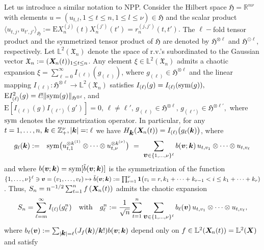 \documentclass[10pt]{article}
\def\L{\mathbb{L}}
\def\R{\mathbb{R}}
\def\Z{\mathbb{Z}}
\def\E{\mathrm E}
\def\1{{\bf 1}}
\newcommand{\mbf}[1]{\mbox{\boldmath $#1$}}
\newcommand{\HH}{\mathfrak{H}}
\begin{document}
Let us introduce a similar notation to NPP. Consider the Hilbert space $\HH = \R^{n\nu} $ with elements
$u = (u_{t,l}, 1\le t  \le n, 1\le l \le \nu ) \in \HH $ and the scalar product
$\langle u_{t,j}, u_{t', j'} \rangle_{\HH} := \E X^{(j)}_n (t) X^{(j')}_n (t') =  r_n^{(j,j')}(t,t').  $ The $\ell-$fold tensor product and the symmetrized
tensor product of $\HH$ are denoted by
$\HH^{\otimes  \ell} $ and $\HH^{\odot  \ell}, $ respectively.
Let $\L^2({\mathfrak X}_n)$ denote the space of r.v.'s subordinated to the
Gaussian vector  ${\mathfrak X}_n := ({\mbf X}_{\! n}(t))_{1\le t \le n} $. Any element $\xi \in \L^2({\mathfrak X}_n) $ admits a
chaotic expansion $\xi = \sum_{\ell = 0}^\infty I_{(\ell)} (g_{(\ell)})$, where $g_{(\ell)} \in \HH^{\otimes  \ell}$ and
the linear mapping $I_{(\ell)}: \HH^{\otimes  \ell} \to \L^2({\mathfrak X}_n)$ satisfies
$I_{(\ell)}(g) = I_{(\ell)} ({\rm sym}(g)),$ $\E I^2_{(\ell)}(g) = \ell ! \|{\rm sym}(g)\|_{\HH^{\otimes  \ell}}$, and
$\E [I_{(\ell)}(g)I_{(\ell')}(g')] = 0, \, \ell \ne \ell',  \, g_{(\ell)} \in \HH^{\otimes  \ell}, \, g_{(\ell')} \in \HH^{\otimes  \ell'},$
where ${\rm sym}$ denotes the symmetrization operator.
In particular,  for any $t=1, \dots, n,\,  {\mbf k} \in \Z^\nu_+, |{\mbf k}| =: \ell $ we have $H_{\mbf k}({\mbf X}_{\! n}(t))
= I_{(\ell)} \big(g_{\ell}({\mbf k})\big) $, where
\begin{eqnarray*}\label{hermite1}
g_\ell({\mbf k})&:=&{\rm sym} \big(u^{\otimes k^{(1)}}_{t, 1}   \otimes \cdots \otimes
u_{t, \nu}^{\otimes k^{(\nu)}}\big) \
= \ \sum_{{\mbf v}\in \{1, \ldots, \nu\}^\ell } b({\mbf v}; {\mbf k}) \,u_{t,v_1} \otimes \cdots
\otimes u_{t,v_\ell}
\end{eqnarray*}
and where $b({\mbf v}; {\mbf k}) = {\rm sym} [\tilde  b({\mbf v}; {\mbf k})] $
is the symmetrization of the function
$\{1, \dots, \nu\}^\ell \ni {\mbf v} = (v_1, \dots, v_\ell) \mapsto \tilde b({\mbf v}; {\mbf k}) :=  \prod_{r=1}^\nu
\1 \big(v_i = r, k_1 + \dots + k_{r-1} < i \le k_1 + \dots + k_r) $.
Thus, $S_n=n^{-1/2} \sum_{t=1}^n f\left({\mbf X}_{\! n}(t)\right) $ admits the chaotic expansion
$$
S_n=\sum_{\ell =m}^\infty I_{(\ell)}(g_\ell^n)\quad \mbox{with}\quad g_\ell^n := \frac{1}{\sqrt{n}}
\sum_{t=1}^n \sum_{{\mbf v}\in \{1, \ldots, \nu\}^\ell } b_\ell({\mbf v}) \,u_{t,v_1} \otimes \cdots
\otimes u_{t,v_\ell},
$$
where $ b_\ell ({\mbf v}) := \sum_{|{\mbf k}|= \ell} (J_f({\mbf k})/{\mbf k}!) b({\mbf v}; {\mbf k})$ depend only on
$f \in  \L^2({\mbf X}_{\! n}(t)) = \L^2({\mbf X})$ and satisfy
\end{document}
